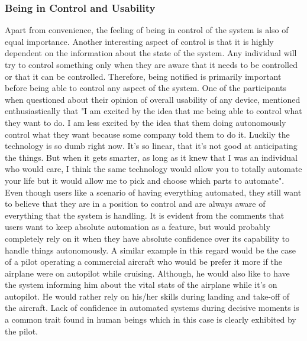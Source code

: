 \subsubsection{Being in Control and Usability}
Apart from convenience, the feeling of being in control of the system is also of equal importance. Another interesting aspect of control is that it is highly dependent on the information about the state of the system. Any individual will try to control something only when they are aware that it needs to be controlled or that it can be controlled. Therefore, being notified is primarily important before being able to control any aspect of the system. One of the participants when questioned about their opinion of overall usability of any device, mentioned enthusiastically that "I am excited by the idea that me being able to control what they want to do. I am less excited by the idea that them doing autonomously control what they want because some company told them to do it. Luckily the technology is so dumb right now. It's so linear, that it's not good at anticipating the things. But when it gets smarter, as long as it knew that I was an individual who would care, I think the same technology would allow you to totally automate your life but it would allow me to pick and choose which parts to automate". Even though users like a scenario of having everything automated, they still want to believe that they are in a position to control and are always aware of everything that the system is handling. It is evident from the comments that users want to keep absolute automation as a feature, but would probably completely rely on it when they have absolute confidence over its capability to handle things autonomously. A similar example in this regard would be the case of a pilot operating a commercial aircraft who would be prefer it more if the airplane were on autopilot while cruising. Although, he would also like to have the system informing him about the vital stats of the airplane while it's on autopilot. He would rather rely on his/her skills during landing and take-off of the aircraft. Lack of confidence in automated systems during decisive moments is a common trait found in human beings which in this case is clearly exhibited by the pilot.

